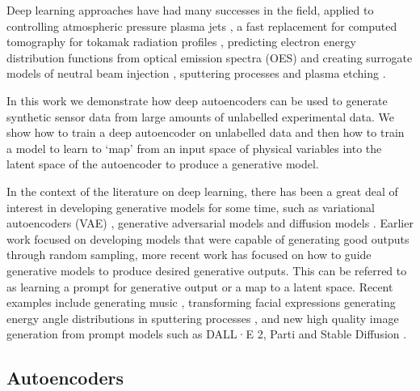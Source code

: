 \documentclass[10pt]{iopart}
\begin{document}
Deep learning approaches have had many successes in the field, applied to controlling atmospheric pressure plasma jets \cite{witmanSimtorealTransferReinforcement2019, mesbahMachineLearningModeling2019}, a fast replacement for computed tomography for tokamak radiation profiles \cite{ferreiraDeepLearningPlasma2020}, predicting electron energy distribution functions from optical emission spectra (OES) \cite{shojaeiApplicationMachineLearning2021} and creating surrogate models of neutral beam injection \cite{boyerRealtimeCapableModeling2019}, sputtering processes \cite{gergsEfficientPlasmasurfaceInteraction2022} and plasma etching \cite{maggipintoDeepVMDeepLearningbased2019}.

In this work we demonstrate how deep autoencoders can be used to generate synthetic sensor data from large amounts of unlabelled experimental data. We show how to train a deep autoencoder on unlabelled data and then how to train a model to learn to `map' from an input space of physical variables into the latent space of the autoencoder to produce a generative model.

In the context of the literature on deep learning, there has been a great deal of interest in developing generative models for some time, such as variational autoencoders (VAE) \cite{kingmaAutoEncodingVariationalBayes2014}, generative adversarial models \cite{goodfellowGenerativeAdversarialNetworks2014} and diffusion models \cite{hoDenoisingDiffusionProbabilistic2020}. Earlier work focused on developing models that were capable of generating good outputs through random sampling, more recent work has focused on how to guide generative models to produce desired generative outputs. This can be referred to as learning a prompt for generative output or a map to a latent space. Recent examples include generating music \cite{choiEncodingMusicalStyle2020, dhariwalJukeboxGenerativeModel2020}, transforming facial expressions  \cite{nitzanFaceIdentityDisentanglement2020} generating energy angle distributions in sputtering processes \cite{gergsEfficientPlasmasurfaceInteraction2022}, and new high quality image generation from prompt models such as DALL·E 2, Parti and Stable Diffusion \cite{rameshHierarchicalTextConditionalImage2022, yuScalingAutoregressiveModels2022, rombachHighResolutionImageSynthesis2022}.



\subsection{Autoencoders}
\end{document}
